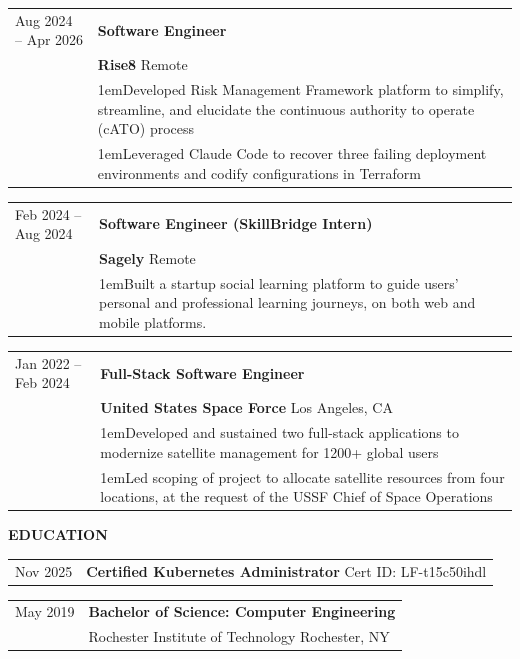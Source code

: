 \documentclass[11pt]{article}
\newlength{\dateColumnWidth}
\newcommand{\customBulletLabel}{\raisebox{0.4ex}{\tiny$\bullet$}}
\newcommand{\detail}{\par\noindent\makebox[1em][l]{\customBulletLabel}\hangindent1em}
\newcommand{\sectionHeader}[1]{{\Large \textbf{#1}}\xhrulefill{black!60}{3pt}\bigbreak}
\begin{document}
\bigbreak
\begin{tabularx}{\textwidth}{@{}p{\dateColumnWidth}X@{}}
	Aug 2024 -- Apr 2026	& \textbf{Software Engineer}																														\\
							& \textbf{Rise8} \textbar{} Remote																													\\
							& \detail Developed Risk Management Framework platform to simplify, streamline, and elucidate the continuous authority to operate (cATO) process	\\
							& \detail Leveraged Claude Code to recover three failing deployment environments and codify configurations in Terraform								\\
\end{tabularx}
\bigbreak
\begin{tabularx}{\textwidth}{@{}p{\dateColumnWidth}X@{}}
	Feb 2024 -- Aug 2024	& \textbf{Software Engineer (SkillBridge Intern)}																									\\
							& \textbf{Sagely} \textbar{} Remote																													\\
							& \detail Built a startup social learning platform to guide users' personal and professional learning journeys, on both web and mobile platforms.	\\
\end{tabularx}
\bigbreak
\begin{tabularx}{\textwidth}{@{}p{\dateColumnWidth}X@{}}
	Jan 2022 -- Feb 2024 	& \textbf{Full-Stack Software Engineer}																											\\
							& \textbf{United States Space Force} \textbar{} Los Angeles, CA																					\\
							& \detail Developed and sustained two full-stack applications to modernize satellite management for 1200+ global users							\\
							& \detail Led scoping of project to allocate satellite resources from four locations, at the request of the USSF Chief of Space Operations		\\
\end{tabularx}
\bigbreak
\sectionHeader{EDUCATION}
\begin{tabularx}{\textwidth}{@{}p{\dateColumnWidth}X@{}}
	Nov 2025 & \textbf{Certified Kubernetes Administrator} \textbar{} Cert ID: LF-t15c50ihdl	\\
\end{tabularx}
\begin{tabularx}{\textwidth}{@{}p{\dateColumnWidth}X@{}}
	May 2019	& \textbf{Bachelor of Science: Computer Engineering}			\\
				& Rochester Institute of Technology \textbar{} Rochester, NY	\\
\end{tabularx}
\bigbreak
\end{document}

